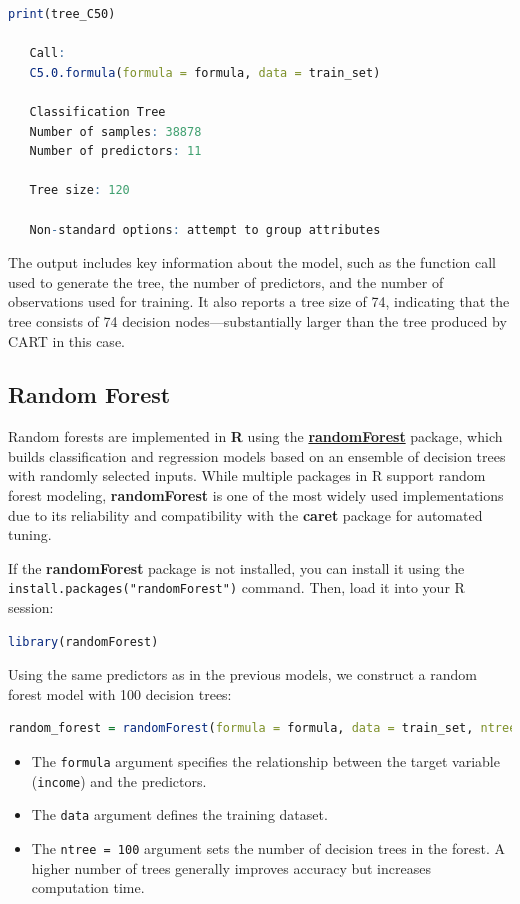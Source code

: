 \documentclass[
  11pt,
]{book}
\newcommand{\passthrough}[1]{#1}
\providecommand{\tightlist}{%
  \setlength{\itemsep}{0pt}\setlength{\parskip}{0pt}}
\theoremstyle{definition}
\theoremstyle{definition}
\theoremstyle{definition}
\theoremstyle{definition}
\theoremstyle{remark}
\begin{document}
\begin{lstlisting}[language=R]
print(tree_C50)
   
   Call:
   C5.0.formula(formula = formula, data = train_set)
   
   Classification Tree
   Number of samples: 38878 
   Number of predictors: 11 
   
   Tree size: 120 
   
   Non-standard options: attempt to group attributes
\end{lstlisting}

The output includes key information about the model, such as the function call used to generate the tree, the number of predictors, and the number of observations used for training. It also reports a tree size of 74, indicating that the tree consists of 74 decision nodes---substantially larger than the tree produced by CART in this case.

\subsection*{Random Forest}\label{random-forest}


Random forests are implemented in \textbf{R} using the \href{https://CRAN.R-project.org/package=randomForest}{\textbf{randomForest}} package, which builds classification and regression models based on an ensemble of decision trees with randomly selected inputs. While multiple packages in R support random forest modeling, \textbf{randomForest} is one of the most widely used implementations due to its reliability and compatibility with the \textbf{caret} package for automated tuning.

If the \textbf{randomForest} package is not installed, you can install it using the \passthrough{\lstinline!install.packages("randomForest")!} command. Then, load it into your R session:

\begin{lstlisting}[language=R]
library(randomForest)
\end{lstlisting}

Using the same predictors as in the previous models, we construct a random forest model with 100 decision trees:

\begin{lstlisting}[language=R]
random_forest = randomForest(formula = formula, data = train_set, ntree = 100)
\end{lstlisting}

\begin{itemize}
\tightlist
\item
  The \passthrough{\lstinline!formula!} argument specifies the relationship between the target variable (\passthrough{\lstinline!income!}) and the predictors.\\
\item
  The \passthrough{\lstinline!data!} argument defines the training dataset.\\
\item
  The \passthrough{\lstinline!ntree = 100!} argument sets the number of decision trees in the forest. A higher number of trees generally improves accuracy but increases computation time.
\end{itemize}
\end{document}
